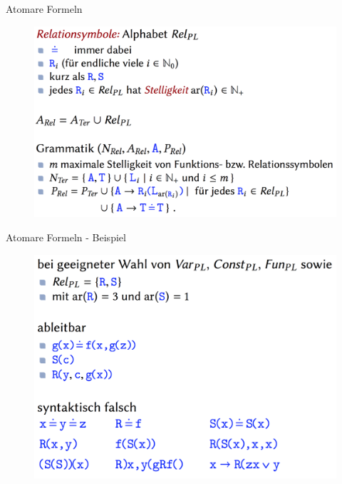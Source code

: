 \begin{frame}{Atomare Formeln}
\begin{figure}[h!]
	\centering
	\includegraphics[scale=0.2]{AFormeln.png} \hspace{2em} 
\end{figure} 
\end{frame}

\begin{frame}{Atomare Formeln - Beispiel}
\begin{figure}[h!]
	\centering
	\includegraphics[scale=0.2]{AFormelnBsp.png} \hspace{2em} 
\end{figure} 
\end{frame}

